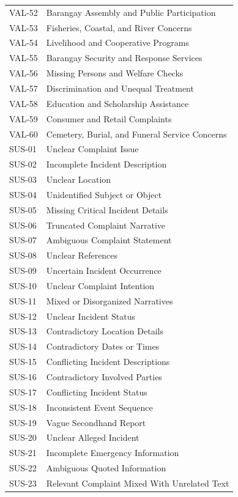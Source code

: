 \begin{longtable}{p{}p{}}
VAL-52 & Barangay Assembly and Public Participation\\
VAL-53 & Fisheries, Coastal, and River Concerns\\
VAL-54 & Livelihood and Cooperative Programs\\
VAL-55 & Barangay Security and Response Services\\
VAL-56 & Missing Persons and Welfare Checks\\
VAL-57 & Discrimination and Unequal Treatment\\
VAL-58 & Education and Scholarship Assistance\\
VAL-59 & Consumer and Retail Complaints\\
VAL-60 & Cemetery, Burial, and Funeral Service Concerns\\
SUS-01 & Unclear Complaint Issue\\
SUS-02 & Incomplete Incident Description\\
SUS-03 & Unclear Location\\
SUS-04 & Unidentified Subject or Object\\
SUS-05 & Missing Critical Incident Details\\
SUS-06 & Truncated Complaint Narrative\\
SUS-07 & Ambiguous Complaint Statement\\
SUS-08 & Unclear References\\
SUS-09 & Uncertain Incident Occurrence\\
SUS-10 & Unclear Complaint Intention\\
SUS-11 & Mixed or Disorganized Narratives\\
SUS-12 & Unclear Incident Status\\
SUS-13 & Contradictory Location Details\\
SUS-14 & Contradictory Dates or Times\\
SUS-15 & Conflicting Incident Descriptions\\
SUS-16 & Contradictory Involved Parties\\
SUS-17 & Conflicting Incident Status\\
SUS-18 & Inconsistent Event Sequence\\
SUS-19 & Vague Secondhand Report\\
SUS-20 & Unclear Alleged Incident\\
SUS-21 & Incomplete Emergency Information\\
SUS-22 & Ambiguous Quoted Information\\
SUS-23 & Relevant Complaint Mixed With Unrelated Text\\

\end{longtable}
